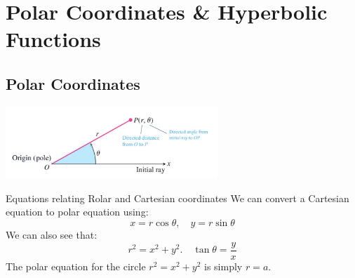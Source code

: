 

\section{Polar Coordinates \& Hyperbolic Functions}

\subsection{Polar Coordinates}
\begin{center}
    \includegraphics[width=0.6\textwidth]{./img/polar.jpg}

\end{center}
\begin{definition}
    {Equations relating Rolar and Cartesian coordinates}
    We can convert a Cartesian equation to polar equation using:
    \[x=r\cos\theta,\quad y=r\sin\theta\]
    We can also see that:
    \[r^2=x^2+y^2.\quad \tan\theta=\frac{y}{x}\]
    The polar equation for the circle $r^2 = x^2 + y^2$ is simply $r=a$.
\end{definition}

